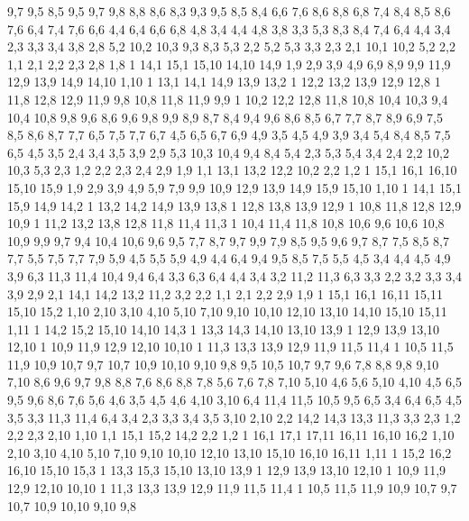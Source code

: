 9,7
9,5
%
8,5
9,5
9,7
9,8
8,8
8,6
%
8,3
9,3
9,5
8,5
8,4
%
6,6
7,6
8,6
8,8
6,8
%
7,4
8,4
8,5
8,6
7,6
%
6,4
7,4
7,6
6,6
%
4,4
6,4
6,6
6,8
4,8
%
3,4
4,4
4,8
3,8
%
3,3
5,3
8,3
8,4
7,4
6,4
4,4
3,4
%
2,3
3,3
3,4
3,8
2,8
%
5,2
10,2
10,3
9,3
8,3
5,3
%
2,2
5,2
5,3
3,3
2,3
%
2,1
10,1
10,2
5,2
2,2
%
1,1
2,1
2,2
2,3
2,8
1,8
1%
14,1
15,1
15,10
14,10
14,9
%
1,9
2,9
3,9
4,9
6,9
8,9
9,9
11,9
12,9
13,9
14,9
14,10
1,10
1%
13,1
14,1
14,9
13,9
13,2
1%
12,2
13,2
13,9
12,9
12,8
1%
11,8
12,8
12,9
11,9
%
9,8
10,8
11,8
11,9
9,9
1%
10,2
12,2
12,8
11,8
10,8
10,4
10,3
%
9,4
10,4
10,8
9,8
9,6
%
8,6
9,6
9,8
9,9
8,9
8,7
%
8,4
9,4
9,6
8,6
8,5
%
6,7
7,7
8,7
8,9
6,9
%
7,5
8,5
8,6
8,7
7,7
%
6,5
7,5
7,7
6,7
%
4,5
6,5
6,7
6,9
4,9
%
3,5
4,5
4,9
3,9
%
3,4
5,4
8,4
8,5
7,5
6,5
4,5
3,5
%
2,4
3,4
3,5
3,9
2,9
%
5,3
10,3
10,4
9,4
8,4
5,4
%
2,3
5,3
5,4
3,4
2,4
%
2,2
10,2
10,3
5,3
2,3
%
1,2
2,2
2,3
2,4
2,9
1,9
%
1,1
13,1
13,2
12,2
10,2
2,2
1,2
1%
15,1
16,1
16,10
15,10
15,9
%
1,9
2,9
3,9
4,9
5,9
7,9
9,9
10,9
12,9
13,9
14,9
15,9
15,10
1,10
1%
14,1
15,1
15,9
14,9
14,2
1%
13,2
14,2
14,9
13,9
13,8
1%
12,8
13,8
13,9
12,9
1%
10,8
11,8
12,8
12,9
10,9
1%
11,2
13,2
13,8
12,8
11,8
11,4
11,3
1%
10,4
11,4
11,8
10,8
10,6
%
9,6
10,6
10,8
10,9
9,9
9,7
%
9,4
10,4
10,6
9,6
9,5
%
7,7
8,7
9,7
9,9
7,9
%
8,5
9,5
9,6
9,7
8,7
%
7,5
8,5
8,7
7,7
%
5,5
7,5
7,7
7,9
5,9
%
4,5
5,5
5,9
4,9
%
4,4
6,4
9,4
9,5
8,5
7,5
5,5
4,5
%
3,4
4,4
4,5
4,9
3,9
%
6,3
11,3
11,4
10,4
9,4
6,4
%
3,3
6,3
6,4
4,4
3,4
%
3,2
11,2
11,3
6,3
3,3
%
2,2
3,2
3,3
3,4
3,9
2,9
%
2,1
14,1
14,2
13,2
11,2
3,2
2,2
%
1,1
2,1
2,2
2,9
1,9
1%
15,1
16,1
16,11
15,11
15,10
15,2
%
1,10
2,10
3,10
4,10
5,10
7,10
9,10
10,10
12,10
13,10
14,10
15,10
15,11
1,11
1%
14,2
15,2
15,10
14,10
14,3
1%
13,3
14,3
14,10
13,10
13,9
1%
12,9
13,9
13,10
12,10
1%
10,9
11,9
12,9
12,10
10,10
1%
11,3
13,3
13,9
12,9
11,9
11,5
11,4
1%
10,5
11,5
11,9
10,9
10,7
%
9,7
10,7
10,9
10,10
9,10
9,8
%
9,5
10,5
10,7
9,7
9,6
%
7,8
8,8
9,8
9,10
7,10
%
8,6
9,6
9,7
9,8
8,8
%
7,6
8,6
8,8
7,8
%
5,6
7,6
7,8
7,10
5,10
%
4,6
5,6
5,10
4,10
%
4,5
6,5
9,5
9,6
8,6
7,6
5,6
4,6
%
3,5
4,5
4,6
4,10
3,10
%
6,4
11,4
11,5
10,5
9,5
6,5
%
3,4
6,4
6,5
4,5
3,5
%
3,3
11,3
11,4
6,4
3,4
%
2,3
3,3
3,4
3,5
3,10
2,10
%
2,2
14,2
14,3
13,3
11,3
3,3
2,3
%
1,2
2,2
2,3
2,10
1,10
%
1,1
15,1
15,2
14,2
2,2
1,2
1%
16,1
17,1
17,11
16,11
16,10
16,2
%
1,10
2,10
3,10
4,10
5,10
7,10
9,10
10,10
12,10
13,10
15,10
16,10
16,11
1,11
1%
15,2
16,2
16,10
15,10
15,3
1%
13,3
15,3
15,10
13,10
13,9
1%
12,9
13,9
13,10
12,10
1%
10,9
11,9
12,9
12,10
10,10
1%
11,3
13,3
13,9
12,9
11,9
11,5
11,4
1%
10,5
11,5
11,9
10,9
10,7
%
9,7
10,7
10,9
10,10
9,10
9,8
